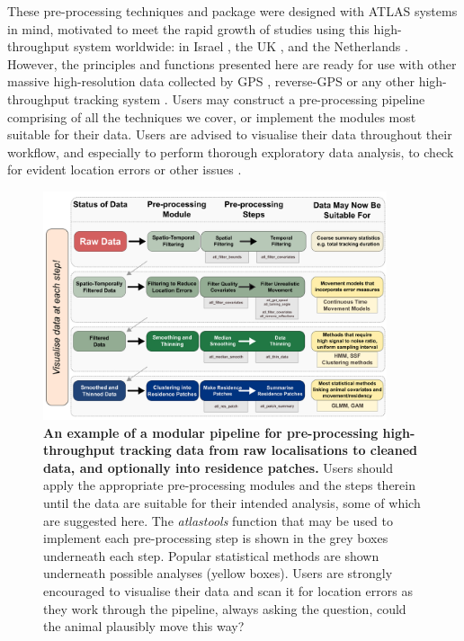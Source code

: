     These pre-processing techniques and package were designed with ATLAS systems in mind, motivated to meet the rapid growth of studies using this high-throughput system worldwide: in Israel \citep{toledo2014, toledo2016, toledo2020, corl2020, vilk2021}, the UK \citep{beardsworth2021a, beardsworth2021b}, and the Netherlands \citep[][Bijleveld et al. \textit{in prep.}]{beardsworth2021}. 
    However, the principles and functions presented here are ready for use with other massive high-resolution data collected by GPS \citep[e.g.][]{papageorgiou2019}, reverse-GPS \citep[e.g.][]{aspillaga2021} or any other high-throughput tracking system .
    Users may construct a pre-processing pipeline comprising of all the techniques we cover, or implement the modules most suitable for their data.
    Users are advised to visualise their data throughout their workflow, and especially to perform thorough exploratory data analysis, to check for evident location errors or other issues \citep{slingsby2016}.

    \begin{figure}[ht!]
        \centering
        \includegraphics[width=0.9\textwidth]{figures/preprocessing/fig_02.png}
        \caption{
            \textbf{An example of a modular pipeline for pre-processing high-throughput tracking data from raw localisations to cleaned data, and optionally into residence patches.}
            Users should apply the appropriate pre-processing modules and the steps therein until the data are suitable for their intended analysis, some of which are suggested here.
            The \textit{atlastools} function that may be used to implement each pre-processing step is shown in the grey boxes underneath each step.
            Popular statistical methods are shown underneath possible analyses (yellow boxes).
            Users are strongly encouraged to visualise their data and scan it for location errors as they work through the pipeline, always asking the question, could the animal plausibly move this way?
        }
        \label{preproc_fig_02}
    \end{figure}


